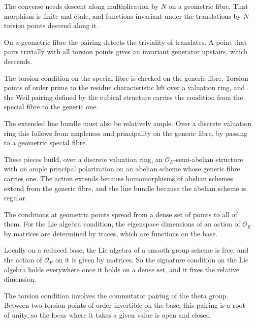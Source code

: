The converse needs descent along multiplication by $N$ on a geometric fibre. That morphism is finite and \'etale,
and functions invariant under the translations by $N$-torsion points descend along it.

On a geometric fibre the pairing detects the triviality of translates. A point that pairs trivially with all
torsion points gives an invariant generator upstairs, which descends.

The torsion condition on the special fibre is checked on the generic fibre. Torsion points of order prime to the
residue characteristic lift over a valuation ring, and the Weil pairing defined by the cubical structure carries
the condition from the special fibre to the generic one.

The extended line bundle must also be relatively ample. Over a discrete valuation ring this follows from
ampleness and principality on the generic fibre, by passing to a geometric special fibre.

These pieces build, over a discrete valuation ring, an $\mathcal O_E$-semi-abelian structure with an ample
principal polarization on an abelian scheme whose generic fibre carries one. The action extends because
homomorphisms of abelian schemes extend from the generic fibre, and the line bundle because the abelian
scheme is regular.

The conditions at geometric points spread from a dense set of points to all of them. For the Lie algebra
condition, the eigenspace dimensions of an action of $\mathcal O_E$ by matrices are determined by traces,
which are functions on the base.

Locally on a reduced base, the Lie algebra of a smooth group scheme is free, and the action of
$\mathcal O_E$ on it is given by matrices. So the signature condition on the Lie algebra holds everywhere
once it holds on a dense set, and it fixes the relative dimension.

The torsion condition involves the commutator pairing of the theta group. Between two torsion points of order
invertible on the base, this pairing is a root of unity, so the locus where it takes a given value is open and
closed.

